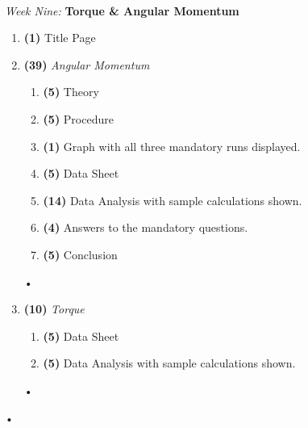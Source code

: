 \documentclass[main.tex]{subfiles}
\begin{document}
\begin{samepage}
\hrulefill \\
\emph{Week Nine:} \textbf{Torque \& Angular Momentum}
\begin{enumerate}
\item
\textbf{(1)} Title Page
\item
\textbf{(39)} \emph{Angular Momentum}
\begin{enumerate}
\item
\textbf{(5)} Theory
\item
\textbf{(5)} Procedure
\item
\textbf{(1)} Graph with all three mandatory runs displayed.
\item
\textbf{(5)} Data Sheet
\item
\textbf{(14)} Data Analysis with sample calculations shown.
\item
\textbf{(4)} Answers to the mandatory questions.
\item
\textbf{(5)} Conclusion
\end{enumerate}•
\item
\textbf{(10)} \emph{Torque}
\begin{enumerate}
\item
\textbf{(5)} Data Sheet
\item
\textbf{(5)} Data Analysis with sample calculations shown.
\end{enumerate}•
\end{enumerate}•
\end{samepage}
\end{document}
